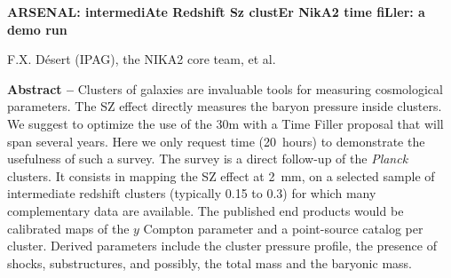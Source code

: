 \documentclass[11pt,a4paper,twoside,graphicx,color]{article}
\begin{document}
%
%
\begin{center}{\huge \bf
ARSENAL: intermediAte Redshift Sz clustEr NikA2 time fiLler: a demo run
}\end{center}
% 
\begin{center}
F.X. D\'esert (IPAG), the NIKA2 core team, et al.
\end{center}

\vspace{-0.3cm}
       {\bf Abstract -- } Clusters of galaxies are invaluable tools
       for measuring cosmological parameters. The SZ effect directly
       measures the baryon pressure inside clusters. We suggest to
       optimize the use of the 30m with a Time Filler proposal that
       will span several years. Here we only request time (20~hours)
       to demonstrate the usefulness of such a survey. The survey is a
       direct follow-up of the {\sl Planck} clusters. It consists in
       mapping the SZ effect at 2~mm, on a selected sample of
       intermediate redshift clusters (typically 0.15 to 0.3) for
       which many complementary data are available. The published end
       products would be calibrated maps of the $y$ Compton parameter
       and a point-source catalog per cluster. Derived parameters
       include the cluster pressure profile, the presence of shocks,
       substructures, and possibly, the total mass and the baryonic
       mass.\\

\end{document}
